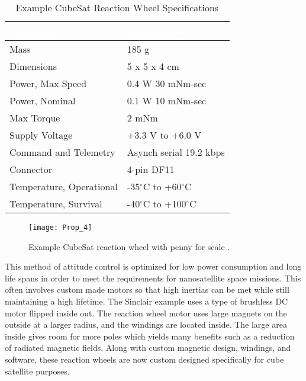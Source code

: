 \documentclass[nocover]            %
{CSLI}                       %
\begin{document}
\begin{table}[H]
\centering
\caption{Example CubeSat Reaction Wheel Specifications \cite{Sinclair}}
\begin{tabular}{| l | l |}
\arrayrulecolor{white}
\hline
\rowcolor{gray!80}
\textcolor{white}{\textbf{Parameter}} & \textcolor{white}{\textbf{Specification}} \\ \hline
\rowcolor{gray!10}
Mass & 185 g \\ \hline
\rowcolor{gray!5}
Dimensions & 5 x 5 x 4 cm \\ \hline
\rowcolor{gray!10}
Power, Max Speed &  0.4 W \@ 30 mNm-sec \\ \hline
\rowcolor{gray!5}
Power, Nominal &  0.1 W \@ 10 mNm-sec \\ \hline
\rowcolor{gray!10}
Max Torque & 2 mNm \\ \hline
\rowcolor{gray!5}
Supply Voltage & +3.3 V to +6.0 V \\ \hline
\rowcolor{gray!10}
Command and Telemetry & Asynch serial 19.2 kbps\\ \hline
\rowcolor{gray!5}
Connector & 4-pin DF11 \\ \hline
\rowcolor{gray!10}
Temperature, Operational & -35$^\circ$C to +60$^\circ$C \\ \hline
\rowcolor{gray!5}
Temperature, Survival & -40$^\circ$C to +100$^\circ$C \\ \hline
\end{tabular}
\end{table}

\begin{figure}[H]
\centering
    \texttt{[image: Prop\_4]}
    \caption{Example CubeSat reaction wheel with penny for scale \cite{Sinclair}.}
\end{figure}

This method of attitude control is optimized for low power consumption and long life spans in order to meet the requirements for nanosatellite space missions. This often involves custom made motors so that high inertias can be met while still maintaining a high lifetime. The Sinclair example uses a type of brushless DC motor flipped inside out. The reaction wheel motor uses large magnets on the outside at a larger radius, and the windings are located inside. The large area inside gives room for more poles which yields many benefits such as a reduction of radiated magnetic fields. Along with custom magnetic design, windings, and software, these reaction wheels are now custom designed specifically for cube satellite purposes.
\end{document}
